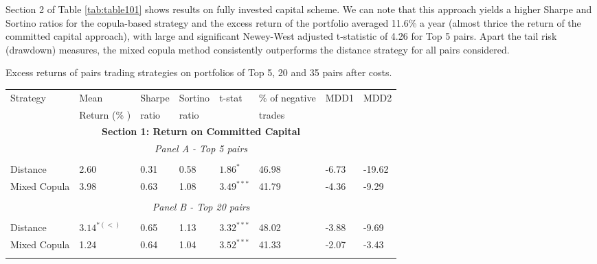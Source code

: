 \documentclass[a4paper,12pt]{report}
\begin{document}
\begin{refsection}
	Section 2 of Table \ref{tab:table101} shows results on fully invested capital scheme. We can note that this approach yields a higher Sharpe and Sortino ratios for the copula-based strategy and the excess return of the portfolio averaged 11.6\% a year (almost thrice the return of the committed capital approach), with large and significant Newey-West adjusted t-statistic of 4.26 for Top 5 pairs. Apart the tail risk (drawdown) measures, the mixed copula method consistently outperforms the distance strategy for all pairs considered.\\
	
	\begin{threeparttable}[H]
		\centering \tiny
		\caption{Excess returns of pairs trading strategies on portfolios of Top 5, 20 and 35 pairs after costs.}
		\begin{tabularx}{\textwidth}{@{\extracolsep{\fill}}llllllll@{}}
			\toprule
			Strategy & Mean  & Sharpe & Sortino & t-stat & \% of negative   & MDD1 & MDD2 \\
			& Return (\% ) & ratio &  ratio     &  &  trades     &       &  \\
			\midrule
			\multicolumn{8}{c}{\textbf{Section 1: Return on Committed Capital}} \\
			\multicolumn{8}{c}{\textit{Panel A - Top 5 pairs}} \\
			&       &       &       &       &       &       &  \\
			Distance & 2.60  & 0.31  & 0.58  & $1.86^{*}$  & 46.98 & -6.73    & -19.62 \\
			Mixed Copula &  3.98  &  0.63  & 1.08  &  $3.49^{***}$  &  41.79 &  -4.36  &  -9.29 \\
			\multicolumn{1}{r}{} & \multicolumn{1}{r}{} & \multicolumn{1}{r}{} & \multicolumn{1}{r}{} & \multicolumn{1}{r}{} & \multicolumn{1}{r}{} & \multicolumn{1}{r}{} & \multicolumn{1}{r}{} \\
			\multicolumn{8}{c}{\textit{Panel B - Top 20 pairs}} \\
			&       &       &       &       &       &       &  \\
			Distance &  $3.14^{*(<)}$  &  0.65  & 1.13  & $3.32^{***}$  & 48.02 & -3.88  & -9.69 \\
			Mixed Copula  & 1.24  & 0.64  & 1.04  & $3.52^{***}$  & 41.33 &  -2.07  &  -3.43  \\
			\multicolumn{1}{r}{} & \multicolumn{1}{r}{} & \multicolumn{1}{r}{} & \multicolumn{1}{r}{} & \multicolumn{1}{r}{} & \multicolumn{1}{r}{} & \multicolumn{1}{r}{} & \multicolumn{1}{r}{} \\

\end{tabularx}
\end{threeparttable}
\end{refsection}
\end{document}
